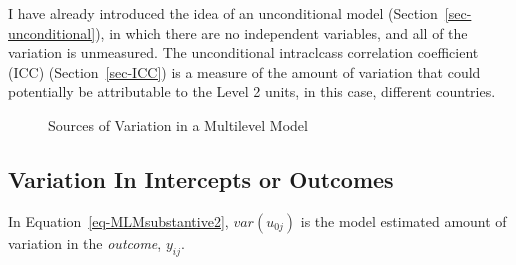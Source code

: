\documentclass[
  letterpaper,
  DIV=11,
  numbers=noendperiod]{scrreprt}
\begin{document}
I have already introduced the idea of an unconditional model
(Section~\ref{sec-unconditional}), in which there are no independent
variables, and all of the variation is unmeasured. The unconditional
intraclcass correlation coefficient (ICC) (Section~\ref{sec-ICC}) is a
measure of the amount of variation that could potentially be
attributable to the Level 2 units, in this case, different countries.

\begin{figure}


\caption{\label{fig-variationsources}Sources of Variation in a
Multilevel Model}

\end{figure}%

\subsection{Variation In Intercepts or
Outcomes}\label{variation-in-intercepts-or-outcomes}

In Equation~\ref{eq-MLMsubstantive2}, \(var(u_{0j})\) is the model
estimated amount of variation in the \emph{outcome}, \(y_{ij}\).
\end{document}

